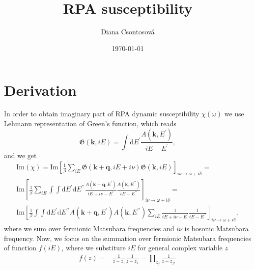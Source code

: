 \documentclass[preprint,prb,amsmath,superscriptaddress,showpacs]{revtex4}
\begin{document}
\title{RPA susceptibility}

\author{Diana Csontosová}

\date{\today}

\maketitle

\section{Derivation}


In order to obtain imaginary part of RPA dynamic susceptibility
$\chi(\omega)$ we use Lehmann representation of Green's function, which reads
%
\begin{equation}
    \mathfrak{G}(\mathbf{k}, iE) = \int \mathrm{d}E^{\prime}
    \frac{A(\mathbf{k}, E^{\prime})}{iE - E^{\prime}},
\end{equation}
%
and we get
%
\begin{equation}
    \begin{gathered}
    \mathrm{Im}(\chi) = \mathrm{Im}\left[ \frac{1}{\beta} \sum_{iE} \mathfrak{G}(\mathbf{k}+\mathbf{q}, iE + i\nu)\mathfrak{G}(\mathbf{k}, iE) \right]_{i\nu \rightarrow  \omega + i\delta} = \\
    \mathrm{Im}\left[ \frac{1}{\beta} \sum_{iE}  \int \int
      \mathrm{d}E^{\prime} \mathrm{d}E^{\prime \prime}
    \frac{A(\mathbf{k} + \mathbf{q}, E^{\prime})}{iE + i\nu - E^{\prime}}
    \frac{A(\mathbf{k}, E^{\prime \prime})}{iE - E^{\prime \prime}}
  \right]_{i\nu \rightarrow \omega + i\delta} = \\
  \mathrm{Im}\left[ \frac{1}{\beta} \int \int
      \mathrm{d}E^{\prime} \mathrm{d}E^{\prime \prime} A(\mathbf{k} +
      \mathbf{q}, E^{\prime}) A(\mathbf{k}, E^{\prime \prime}) \sum_{iE}
    \frac{1}{iE + i\nu - E^{\prime}}
    \frac{1}{iE - E^{\prime \prime}}
  \right]_{i\nu \rightarrow \omega + i\delta},
    \end{gathered}
  \end{equation}
%
where we sum over fermionic Matsubara frequencies and $i\nu$ is
bosonic Matsubara frequency. Now, we focus on the summation over
fermionic Matsubara frequencies of function $f(iE)$, where we substiture $iE$ for general complex
variable $z$
%
\begin{align}
    f(z) =& \frac{1}{z - z_1} \frac{1}{z - z_2} = \prod\limits_{z_j} \frac{1}{z - z_j,}
 \end{align}
\end{document}
